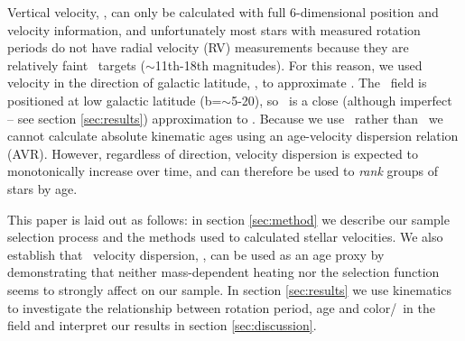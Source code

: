 Vertical velocity, \vz, can only be calculated with full 6-dimensional
position and velocity information, and unfortunately most stars with measured
rotation periods do not have radial velocity (RV) measurements because they
are relatively faint \kepler\ targets ($\sim$11th-18th magnitudes).
For this reason, we used velocity in the direction of galactic latitude, \vb,
to approximate \vz.
The \kepler\ field is positioned at low galactic latitude
(b=$\sim$5-20\degrees), so \vb\ is a close (although imperfect -- see section
\ref{sec:results}) approximation to \vz.
Because we use \vb\ rather than \vz\, we cannot calculate absolute kinematic
ages using an age-velocity dispersion relation (AVR).
However, regardless of direction, velocity dispersion is expected to
monotonically increase over time, and can therefore be used to {\it rank}
groups of stars by age.

This paper is laid out as follows: in section \ref{sec:method} we describe our
sample selection process and the methods used to calculated stellar
velocities.
We also establish that \vb\ velocity dispersion, \sigmavb, can be used as an
age proxy by demonstrating that neither mass-dependent heating nor the
selection function seems to strongly affect on our sample.
In section \ref{sec:results} we use kinematics to investigate the
relationship between rotation period, age and color/\teff\ in the field and
interpret our results in section \ref{sec:discussion}.


